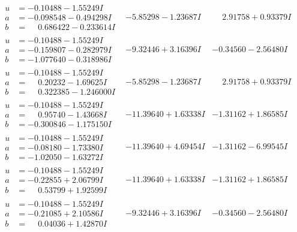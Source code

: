 \documentclass[1p]{elsarticle_modified}
\theoremstyle{definition}
\begin{document}
$$\begin{array}{c|c|c}
\begin{aligned}
u &= -0.10488 - 1.55249 I \\
a &= -0.098548 - 0.494298 I \\
b &= \phantom{-}0.686422 - 0.233614 I\end{aligned}
 & -5.85298 - 1.23687 I & \phantom{-}2.91758 + 0.93379 I \\ \hline\begin{aligned}
u &= -0.10488 - 1.55249 I \\
a &= -0.159807 - 0.282979 I \\
b &= -1.077640 - 0.318986 I\end{aligned}
 & -9.32446 + 3.16396 I & -0.34560 - 2.56480 I \\ \hline\begin{aligned}
u &= -0.10488 - 1.55249 I \\
a &= \phantom{-}0.20232 - 1.69625 I \\
b &= \phantom{-}0.322385 - 1.246000 I\end{aligned}
 & -5.85298 - 1.23687 I & \phantom{-}2.91758 + 0.93379 I \\ \hline\begin{aligned}
u &= -0.10488 - 1.55249 I \\
a &= \phantom{-}0.95740 - 1.43668 I \\
b &= -0.300846 - 1.175150 I\end{aligned}
 & -11.39640 + 1.63338 I & -1.31162 + 1.86585 I \\ \hline\begin{aligned}
u &= -0.10488 - 1.55249 I \\
a &= -0.08180 - 1.73380 I \\
b &= -1.02050 - 1.63272 I\end{aligned}
 & -11.39640 + 4.69454 I & -1.31162 - 6.99545 I \\ \hline\begin{aligned}
u &= -0.10488 - 1.55249 I \\
a &= -0.22855 + 2.06799 I \\
b &= \phantom{-}0.53799 + 1.92599 I\end{aligned}
 & -11.39640 + 1.63338 I & -1.31162 + 1.86585 I \\ \hline\begin{aligned}
u &= -0.10488 - 1.55249 I \\
a &= -0.21085 + 2.10586 I \\
b &= \phantom{-}0.04036 + 1.42870 I\end{aligned}
 & -9.32446 + 3.16396 I & -0.34560 - 2.56480 I \\ \hline\begin{aligned}

\end{aligned}
\end{array}$$
\end{document}
